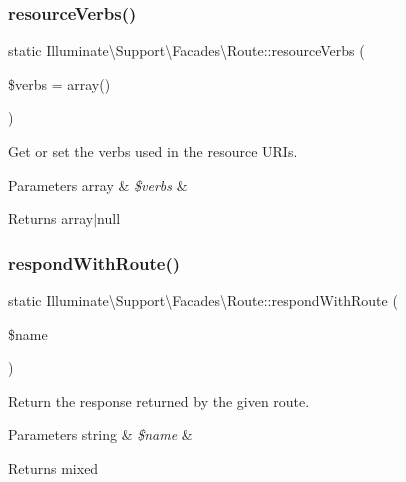 \subsubsection{\texorpdfstring{resource\+Verbs()}{resourceVerbs()}}
{\footnotesize\ttfamily static Illuminate\textbackslash{}\+Support\textbackslash{}\+Facades\textbackslash{}\+Route\+::resource\+Verbs (\begin{DoxyParamCaption}\item[{}]{\$verbs = {\ttfamily array()} }\end{DoxyParamCaption})\hspace{0.3cm}{\ttfamily [static]}}

Get or set the verbs used in the resource U\+R\+Is.


\begin{DoxyParams}[1]{Parameters}
array & {\em \$verbs} & \\
\hline
\end{DoxyParams}
\begin{DoxyReturn}{Returns}
array$\vert$null 
\end{DoxyReturn}
\mbox{\label{class_illuminate_1_1_support_1_1_facades_1_1_route_ac0573684cafafad11cb8fe7c470a766b}} 
\subsubsection{\texorpdfstring{respond\+With\+Route()}{respondWithRoute()}}
{\footnotesize\ttfamily static Illuminate\textbackslash{}\+Support\textbackslash{}\+Facades\textbackslash{}\+Route\+::respond\+With\+Route (\begin{DoxyParamCaption}\item[{}]{\$name }\end{DoxyParamCaption})\hspace{0.3cm}{\ttfamily [static]}}

Return the response returned by the given route.


\begin{DoxyParams}[1]{Parameters}
string & {\em \$name} & \\
\hline
\end{DoxyParams}
\begin{DoxyReturn}{Returns}
mixed 
\end{DoxyReturn}
\mbox{\label{class_illuminate_1_1_support_1_1_facades_1_1_route_a1622d20eba5c59f93b6d28a021439769}} 

